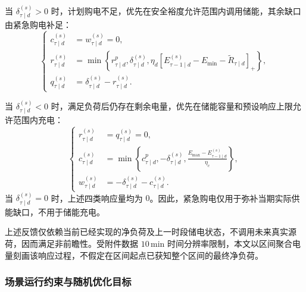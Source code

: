 \documentclass[zihao=-4,a4paper,UTF8,fontset=none]{ctexart}
\begin{document}
当 $\delta_{\tau\mid d}^{(s)}>0$ 时，计划购电不足，优先在安全裕度允许范围内调用储能，其余缺口由紧急购电补足：
\begin{equation}
\left\{
\begin{aligned}
    c_{\tau\mid d}^{(s)}
    &=
    w_{\tau\mid d}^{(s)}
    =
    0,
    \\
    r_{\tau\mid d}^{(s)}
    &=
    \min
    \left\{
        r_{\tau\mid d}^{p},
        \delta_{\tau\mid d}^{(s)},
        \eta_d
        \left[
            E_{\tau-1\mid d}^{(s)}
            -
            E_{\min}
            -
            \widetilde R_{\tau\mid d}
        \right]_+
    \right\},
    \\
    q_{\tau\mid d}^{(s)}
    &=
    \delta_{\tau\mid d}^{(s)}
    -
    r_{\tau\mid d}^{(s)} .
\end{aligned}
\right.
\label{eq:q2_shortage_response}
\end{equation}

当 $\delta_{\tau\mid d}^{(s)}<0$ 时，满足负荷后仍存在剩余电量，优先在储能容量和预设响应上限允许范围内充电：
\begin{equation}
\left\{
\begin{aligned}
    r_{\tau\mid d}^{(s)}
    &=
    q_{\tau\mid d}^{(s)}
    =
    0,
    \\
    c_{\tau\mid d}^{(s)}
    &=
    \min
    \left\{
        c_{\tau\mid d}^{p},
        -\delta_{\tau\mid d}^{(s)},
        \frac{
            E_{\max}-E_{\tau-1\mid d}^{(s)}
        }{\eta_c}
    \right\},
    \\
    w_{\tau\mid d}^{(s)}
    &=
    -\delta_{\tau\mid d}^{(s)}
    -
    c_{\tau\mid d}^{(s)} .
\end{aligned}
\right.
\label{eq:q2_surplus_response}
\end{equation}
当 $\delta_{\tau\mid d}^{(s)}=0$ 时，上述四类响应量均为 $0$。因此，紧急购电仅用于弥补当期实际供能缺口，不用于储能充电。

上述反馈仅依赖当前已经实现的净负荷及上一时段储电状态，不调用未来真实源荷，因而满足非前瞻性。受附件数据 $10\,\mathrm{min}$ 时间分辨率限制，本文以区间聚合电量刻画该响应过程，不假定在区间起点已获知整个区间的最终净负荷。


\subsubsection{场景运行约束与随机优化目标}
\end{document}
